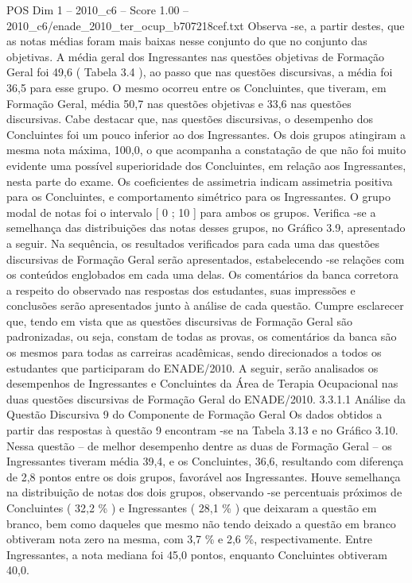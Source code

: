 \begin{textsample}{POS Dim 1 – 2010\_c6 – Score 1.00 – 2010\_c6/enade\_2010\_ter\_ocup\_b707218cef.txt}
Observa -se, a partir destes, que as notas médias foram mais baixas nesse conjunto do que no conjunto das objetivas.
A média geral dos Ingressantes nas questões objetivas de Formação Geral foi 49,6 ( Tabela 3.4 ), ao passo que nas questões discursivas, a média foi 36,5 para esse grupo.
O mesmo ocorreu entre os Concluintes, que tiveram, em Formação Geral, média 50,7 nas questões objetivas e 33,6 nas questões discursivas.
Cabe destacar que, nas questões discursivas, o desempenho dos Concluintes foi um pouco inferior ao dos Ingressantes.
Os dois grupos atingiram a mesma nota máxima, 100,0, o que acompanha a constatação de que não foi muito evidente uma possível superioridade dos Concluintes, em relação aos Ingressantes, nesta parte do exame.
Os coeficientes de assimetria indicam assimetria positiva para os Concluintes, e comportamento simétrico para os Ingressantes.
O grupo modal de notas foi o intervalo [ 0 ; 10 ] para ambos os grupos.
Verifica -se a semelhança das distribuições das notas desses grupos, no Gráfico 3.9, apresentado a seguir.
Na sequência, os resultados verificados para cada uma das questões discursivas de Formação Geral serão apresentados, estabelecendo -se relações com os conteúdos englobados em cada uma delas.
Os comentários da banca corretora a respeito do observado nas respostas dos estudantes, suas impressões e conclusões serão apresentados junto à análise de cada questão.
Cumpre esclarecer que, tendo em vista que as questões discursivas de Formação Geral são padronizadas, ou seja, constam de todas as provas, os comentários da banca são os mesmos para todas as carreiras acadêmicas, sendo direcionados a todos os estudantes que participaram do ENADE/2010.
A seguir, serão analisados os desempenhos de Ingressantes e Concluintes da Área de Terapia Ocupacional nas duas questões discursivas de Formação Geral do ENADE/2010. 3.3.1.1 Análise da Questão Discursiva 9 do Componente de Formação Geral Os dados obtidos a partir das respostas à questão 9 encontram -se na Tabela 3.13 e no Gráfico 3.10.
Nessa questão – de melhor desempenho dentre as duas de Formação Geral – os Ingressantes tiveram média 39,4, e os Concluintes, 36,6, resultando com diferença de 2,8 pontos entre os dois grupos, favorável aos Ingressantes.
Houve semelhança na distribuição de notas dos dois grupos, observando -se percentuais próximos de Concluintes ( 32,2 \% ) e Ingressantes ( 28,1 \% ) que deixaram a questão em branco, bem como daqueles que mesmo não tendo deixado a questão em branco obtiveram nota zero na mesma, com 3,7 \% e 2,6 \%, respectivamente.
Entre Ingressantes, a nota mediana foi 45,0 pontos, enquanto Concluintes obtiveram 40,0.

\end{textsample}
